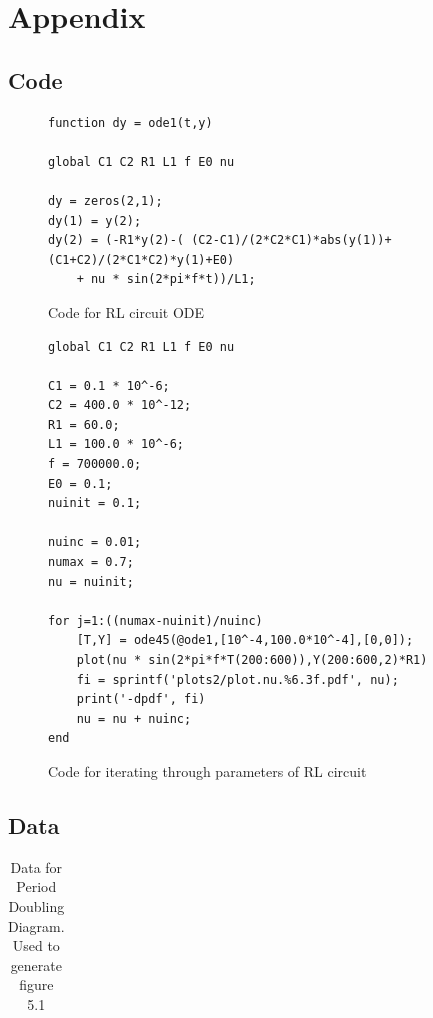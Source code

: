 \documentclass[12pt]{report}
\begin{document}



\chapter{Appendix}

\section{Code}
\label{sec: Code}

\begin{figure}[h]
\begin{lstlisting}
function dy = ode1(t,y)

global C1 C2 R1 L1 f E0 nu

dy = zeros(2,1);
dy(1) = y(2);
dy(2) = (-R1*y(2)-( (C2-C1)/(2*C2*C1)*abs(y(1))+ (C1+C2)/(2*C1*C2)*y(1)+E0)
	+ nu * sin(2*pi*f*t))/L1;
\end{lstlisting}
\caption{Code for RL circuit ODE}
\label{code:ode}
\end{figure}

\begin{figure}[h]
\begin{lstlisting}
global C1 C2 R1 L1 f E0 nu

C1 = 0.1 * 10^-6;
C2 = 400.0 * 10^-12;
R1 = 60.0;
L1 = 100.0 * 10^-6;
f = 700000.0;
E0 = 0.1;
nuinit = 0.1;

nuinc = 0.01;
numax = 0.7;
nu = nuinit;

for j=1:((numax-nuinit)/nuinc)
    [T,Y] = ode45(@ode1,[10^-4,100.0*10^-4],[0,0]);
    plot(nu * sin(2*pi*f*T(200:600)),Y(200:600,2)*R1)
    fi = sprintf('plots2/plot.nu.%6.3f.pdf', nu);
    print('-dpdf', fi)
    nu = nu + nuinc;
end
\end{lstlisting}
	\caption{Code for iterating through parameters of RL circuit}
	\label{code:run}
\end{figure}

\clearpage

\section{Data}
\label{sec:Data}

	\begin{table}[h]
		\centering
		\begin{tabular}{|l|l||l||l||l||l||l||l||l|}
			\hline
			 
		\end{tabular}
		\caption{Data for Period Doubling Diagram. Used to generate figure 5.1}
		\label{tab:bifurcation}
	\end{table}
\end{document}
